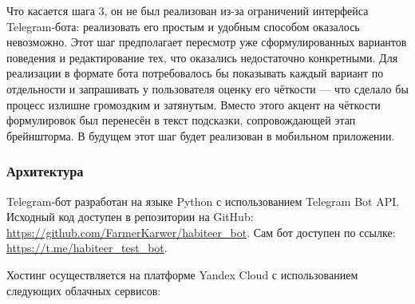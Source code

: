 \documentclass[pdflatex,sn-mathphys-num]{sn-jnl}%
\theoremstyle{thmstyleone}%
\theoremstyle{thmstyletwo}%
\theoremstyle{thmstylethree}%
\begin{document}
Что касается шага 3, он не был реализован из-за ограничений интерфейса Telegram-бота: реализовать его простым и удобным способом оказалось невозможно. Этот шаг предполагает пересмотр уже сформулированных вариантов поведения и редактирование тех, что оказались недостаточно конкретными. Для реализации в формате бота потребовалось бы показывать каждый вариант по отдельности и запрашивать у пользователя оценку его чёткости — что сделало бы процесс излишне громоздким и затянутым. Вместо этого акцент на чёткости формулировок был перенесён в текст подсказки, сопровождающей этап брейншторма. В будущем этот шаг будет реализован в мобильном приложении.

\subsubsection{Архитектура}

Telegram-бот разработан на языке Python с использованием Telegram Bot API. Исходный код доступен в репозитории на GitHub: \url{https://github.com/FarmerKarwer/habiteer_bot}. Сам бот доступен по ссылке: \url{https://t.me/habiteer_test_bot}.

Хостинг осуществляется на платформе Yandex Cloud с использованием следующих облачных сервисов:
\end{document}
